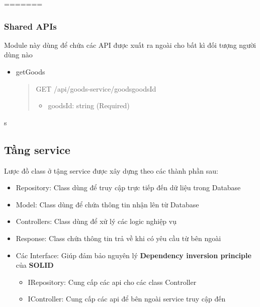 =======

\subsubsection{Shared APIs}
Module này dùng để chứa các API được xuất ra ngoài cho bất kì đối tượng người dùng nào

\begin{itemize}
	\item getGoods
	      \begin{quote}
		      GET /api/goods-service/goods{goodsId}
		      \begin{itemize}
			      \item goodsId: string (Required)
		      \end{itemize}
	      \end{quote}
\end{itemize}

s



\subsection{Tầng service}

Lược đồ class ở tậng service được xây dựng theo các thành phần sau:
\begin{itemize}
	\item Repository: Class dùng để truy cập trực tiếp đến dữ liệu trong Database
	\item Model: Class dùng để chứa thông tin nhận lên từ Database
	\item Controllers: Class dùng để xử lý các logic nghiệp vụ
	\item Response: Class chứa thông tin trả về khi có yêu cầu từ bên ngoài
	\item Các Interface: Giúp đảm bảo nguyên lý \textbf{Dependency inversion principle} của \textbf{SOLID}
	\begin {itemize}
		\item IRepository: Cung cấp các api cho các class Controller
		\item IController: Cung cấp các api để bên ngoài service truy cập đến
	\end{itemize}
\end{itemize}



